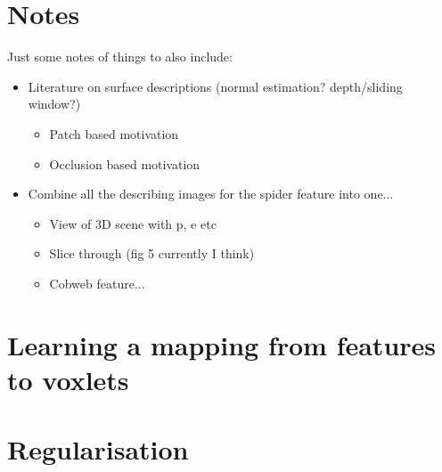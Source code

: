 \documentclass[10pt,twocolumn,letterpaper]{article}
\begin{document}


\section{Notes}
Just some notes of things to also include:

\begin{itemize}
\item Literature on surface descriptions (normal estimation? depth/sliding window?)
\begin{itemize}
\item Patch based motivation
\item Occlusion based motivation
\end{itemize}
\item Combine all the describing images for the spider feature into one...
\begin{itemize}
\item View of 3D scene with p, e etc
\item Slice through (fig 5 currently I think)
\item Cobweb feature...
\end{itemize}
\end{itemize}


\section{Learning a mapping from features to voxlets}


\section{Regularisation}
\end{document}
